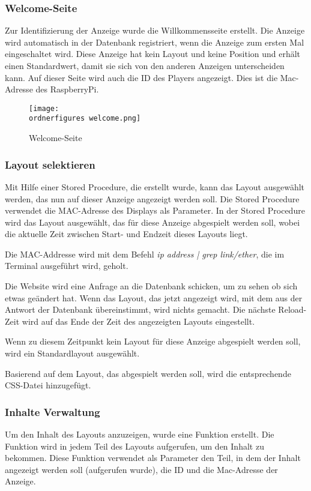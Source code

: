 \subsubsection{Welcome-Seite}
Zur Identifizierung der Anzeige wurde die Willkommensseite  erstellt. Die Anzeige wird automatisch in der Datenbank registriert, wenn die Anzeige zum ersten Mal eingeschaltet wird. Diese Anzeige hat kein Layout und keine Position und erhält einen Standardwert, damit sie sich von den anderen Anzeigen unterscheiden kann. 
Auf dieser Seite wird auch die ID des Players angezeigt. Dies ist die Mac-Adresse des RaspberryPi.
\begin{figure}[H]
	\centering
	\texttt{[image: \\ordnerfigures welcome.png]}
	\caption{Welcome-Seite}
	\label{fi:welcome}
\end{figure} 

\subsubsection{Layout selektieren}

Mit Hilfe einer Stored Procedure, die erstellt wurde, kann das Layout ausgewählt werden, das nun auf dieser Anzeige angezeigt werden soll. Die Stored Procedure verwendet die MAC-Adresse des Displays als Parameter. In der Stored Procedure wird das Layout ausgewählt, das für diese Anzeige abgespielt werden soll, wobei die aktuelle Zeit zwischen Start- und Endzeit dieses Layouts liegt.

Die MAC-Addresse wird mit dem Befehl \textit{ip address | grep link/ether}, die im Terminal ausgeführt wird, geholt.

Die Website wird eine Anfrage an die Datenbank schicken, um zu sehen ob sich etwas geändert hat. Wenn das Layout, das jetzt angezeigt wird, mit dem aus der Antwort der Datenbank übereinstimmt, wird nichts gemacht. Die nächste Reload-Zeit wird auf das Ende der Zeit des angezeigten Layouts eingestellt.

Wenn zu diesem Zeitpunkt kein Layout für diese Anzeige abgespielt werden soll, wird ein Standardlayout ausgewählt.

Basierend auf dem Layout, das abgespielt werden soll, wird die entsprechende CSS-Datei hinzugefügt.

\subsubsection{Inhalte Verwaltung}

Um den Inhalt des Layouts anzuzeigen, wurde eine Funktion erstellt. Die Funktion wird in jedem Teil des Layouts aufgerufen, um den Inhalt zu bekommen. Diese Funktion verwendet als Parameter den Teil, in dem der Inhalt angezeigt werden soll (aufgerufen wurde), die ID und die Mac-Adresse der Anzeige.


